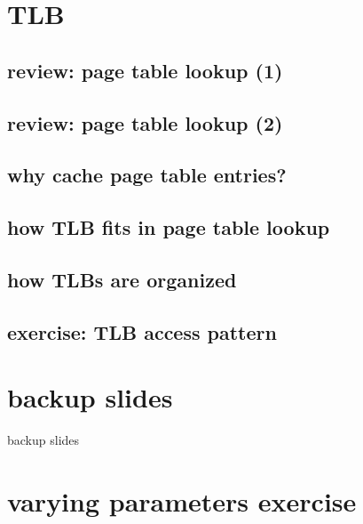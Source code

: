 \section{TLB}

\subsection{review: page table lookup (1)}


\subsection{review: page table lookup (2)}

\subsection{why cache page table entries?}


\subsection{how TLB fits in page table lookup}


\subsection{how TLBs are organized}

\subsection{exercise: TLB access pattern}




\section{backup slides}
\begin{frame}{backup slides}
\end{frame}

\section{varying parameters exercise}



